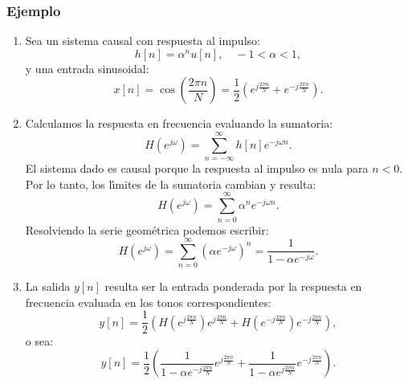 \documentclass[11pt,a4paper,openany]{book}
\begin{document}
\subsubsection{Ejemplo}

\begin{enumerate}
	
	\item Sea un sistema causal con respuesta al impulso:
	\begin{equation}
		h[n] = \alpha^n u[n], \quad -1 < \alpha < 1,
	\end{equation}
	y una entrada sinusoidal:
	\begin{equation}
		x[n] = \cos\left( \frac{2\pi n}{N} \right) = \frac{1}{2} \left( e^{j\frac{2\pi n}{N}} + e^{-j\frac{2\pi n}{N}} \right).
	\end{equation}
	
	\item Calculamos la respuesta en frecuencia evaluando la sumatoria:
	\begin{equation}
		H(e^{j\omega}) = \sum_{n=-\infty}^{\infty} h[n] e^{-j\omega n}.
	\end{equation}
	El sistema dado es causal porque la respuesta al impulso es nula para $n < 0$. Por lo tanto, los l\'{\i}mites de la sumatoria cambian y resulta:
	\begin{equation}
		H(e^{j\omega}) = \sum_{n=0}^{\infty} \alpha^n e^{-j\omega n}.
	\end{equation}
	Resolviendo la serie geométrica podemos escribir:
	\begin{equation}
		H(e^{j\omega}) = \sum_{n=0}^{\infty} (\alpha e^{-j\omega})^n = \frac{1}{1 - \alpha e^{-j\omega}}.
	\end{equation}
	
	\item La salida $y[n]$ resulta ser la entrada ponderada por la respuesta en frecuencia evaluada en los tonos correspondientes:
	\begin{equation}
		y[n] = \frac{1}{2} \left( H\left(e^{j\frac{2\pi n}{N}}\right) e^{j\frac{2\pi n}{N}} + H\left(e^{-j\frac{2\pi n}{N}}\right) e^{-j\frac{2\pi n}{N}} \right),
	\end{equation}
	o sea:
	\begin{equation}
		y[n] = \frac{1}{2} \left( \frac{1}{1 - \alpha e^{-j\frac{2\pi n}{N}}} e^{j\frac{2\pi n}{N}} + \frac{1}{1 - \alpha e^{j\frac{2\pi n}{N}}} e^{-j\frac{2\pi n}{N}} \right).
	\end{equation}
	
\end{enumerate}
\end{document}
